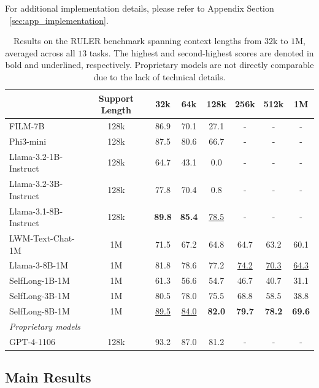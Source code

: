 \documentclass{article}
\begin{document}
For additional implementation details, please refer to Appendix Section ~\ref{sec:app_implementation}.

\begin{table}[ht]
\centering
\caption{Results on the RULER benchmark spanning context lengths from $32$k to $1$M,
averaged across all $13$ tasks.
The highest and second-highest scores are denoted in bold and underlined, respectively.
Proprietary models are not directly comparable due to the lack of technical details.}
\begin{tabular}{lccccccc}
\hline
                & Support Length & 32k & 64k & 128k & 256k & 512k & 1M \\ \hline
FILM-7B  & 128k & 86.9 & 70.1 & 27.1 & - & - & - \\
Phi3-mini  &  128k &  87.5   &  80.6   &  66.7  &  -    &  -    &  -  \\
Llama-3.2-1B-Instruct  & 128k &  64.7  & 43.1  &  0.0  &  -    &  -    &  -  \\
Llama-3.2-3B-Instruct   &  128k &  77.8 &  70.4   &  0.8    &  -    &  -  &   - \\
Llama-3.1-8B-Instruct     & 128k  &  \textbf{89.8}   & \textbf{85.4}  & \underline{78.5}   &  -    &   -   & -   \\
LWM-Text-Chat-1M &  1M &   71.5  &  67.2  &  64.8   &  64.7  &  63.2  &  60.1  \\
Llama-3-8B-1M  &  1M &   81.8  &  78.6  &  77.2   &  \underline{74.2}   &  \underline{70.3}  &  \underline{64.3}  \\ \hline
SelfLong-1B-1M &  1M  &  61.3 & 56.6  &  54.7  &  46.7  &  40.7  &  31.1 \\
SelfLong-3B-1M &  1M  &  80.5 & 78.0 & 75.5 & 68.8 & 58.5 & 38.8 \\
SelfLong-8B-1M &  1M   &  \underline{89.5} & \underline{84.0} & \textbf{82.0} & \textbf{79.7} & \textbf{78.2} & \textbf{69.6} \\ \hline \hline
\multicolumn{8}{l}{\emph{Proprietary models}} \\ \hline
GPT-4-1106  &  128k &  93.2 &  87.0   &  81.2  &  -    &  -    &  -  \\ \hline
\end{tabular}
\label{tab:main_results}
\end{table}

\subsection{Main Results}
\end{document}

